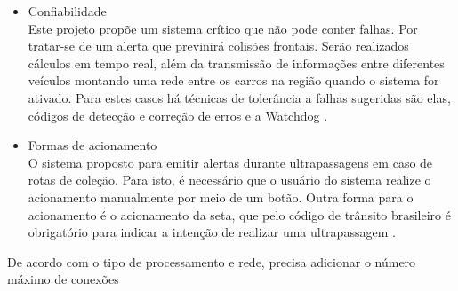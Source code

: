 \begin{itemize}
  \item Confiabilidade\\
  Este projeto propõe um sistema crítico que não pode conter falhas. Por tratar-se de um alerta  que previnirá colisões frontais. Serão realizados cálculos em tempo real, além da transmissão de informações entre diferentes veículos montando uma rede entre os carros na região quando o sistema for ativado.
  Para estes casos há técnicas de tolerância a falhas sugeridas são elas, códigos de detecção e correção de erros e a Watchdog \cite{transponder3}.

  \item Formas de acionamento\\
  O sistema proposto para emitir alertas durante ultrapassagens em caso de rotas de coleção. Para isto, é necessário que o usuário do sistema realize o acionamento manualmente por meio de um botão. Outra forma para o acionamento é o acionamento da seta, que pelo código de trânsito brasileiro é obrigatório para indicar a intenção de realizar uma ultrapassagem \cite{transponder2}.
\end{itemize}

De acordo com o tipo de processamento e rede, precisa adicionar o número máximo de conexões

